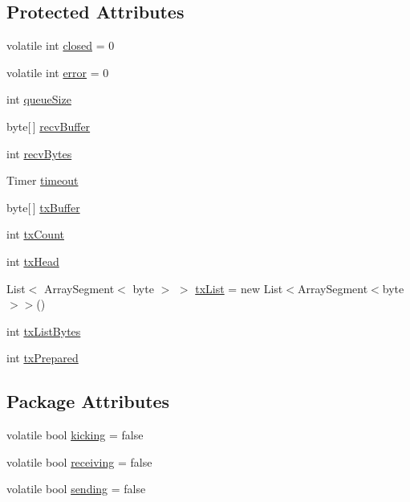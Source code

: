 \subsection*{Protected Attributes}
\begin{DoxyCompactItemize}
\item 
volatile int \hyperlink{classOTA_1_1Sockets_1_1Connection_a03833fbfdec8969d68bbc2c7b8037d39}{closed} = 0
\item 
volatile int \hyperlink{classOTA_1_1Sockets_1_1Connection_a92dad899cc7fec5f17e847448f03a8ac}{error} = 0
\item 
int \hyperlink{classOTA_1_1Sockets_1_1Connection_a6b94fdf3692083a41291eec4920c62d2}{queue\+Size}
\item 
byte\mbox{[}$\,$\mbox{]} \hyperlink{classOTA_1_1Sockets_1_1Connection_a102834be1b2b5b979bbec201dc44c2e3}{recv\+Buffer}
\item 
int \hyperlink{classOTA_1_1Sockets_1_1Connection_a4606666ebcea73230c38cd4590e8ac96}{recv\+Bytes}
\item 
Timer \hyperlink{classOTA_1_1Sockets_1_1Connection_ac1d97d6f72682d419b309966b2776272}{timeout}
\item 
byte\mbox{[}$\,$\mbox{]} \hyperlink{classOTA_1_1Sockets_1_1Connection_ac74132c82fb149407a919ea54defeb92}{tx\+Buffer}
\item 
int \hyperlink{classOTA_1_1Sockets_1_1Connection_a4138727bf43a882bdb66abaeb6bc6232}{tx\+Count}
\item 
int \hyperlink{classOTA_1_1Sockets_1_1Connection_ad8ee620cb5b3b5e638603cc95494d33d}{tx\+Head}
\item 
List$<$ Array\+Segment$<$ byte $>$ $>$ \hyperlink{classOTA_1_1Sockets_1_1Connection_a93f43e13797901adb7f83908644f394e}{tx\+List} = new List$<$Array\+Segment$<$byte$>$$>$()
\item 
int \hyperlink{classOTA_1_1Sockets_1_1Connection_a5d22e869e5b6dcd485410fd0bf17384d}{tx\+List\+Bytes}
\item 
int \hyperlink{classOTA_1_1Sockets_1_1Connection_a75026c451126794ce1f3b199f4f8269d}{tx\+Prepared}
\end{DoxyCompactItemize}
\subsection*{Package Attributes}
\begin{DoxyCompactItemize}
\item 
volatile bool \hyperlink{classOTA_1_1Sockets_1_1Connection_ac47d9786649e56b1651e9e2440997da6}{kicking} = false
\item 
volatile bool \hyperlink{classOTA_1_1Sockets_1_1Connection_a24cbe8e82659a6b1b70c029c05ed762c}{receiving} = false
\item 
volatile bool \hyperlink{classOTA_1_1Sockets_1_1Connection_a3c9c079a5769a46eb86bbac481166bab}{sending} = false
\end{DoxyCompactItemize}
